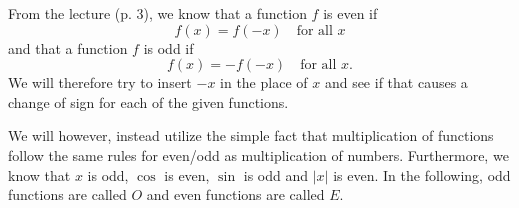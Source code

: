 \begin{derivation}
  From the lecture (p. 3), we know that a function $f$ is even if
  \begin{equation*}
    f(x) = f(-x) \quad \text{for all } x
  \end{equation*}
  and that a function $f$ is odd if
  \begin{equation*}
    f(x) = - f(-x) \quad \text{for all } x
  .\end{equation*}
  We will therefore try to insert $-x$ in the place of $x$ and see if that causes a change of sign for each of the given functions.

  We will however, instead utilize the simple fact that multiplication of functions follow the same rules for even/odd as multiplication of numbers.
  Furthermore, we know that $x$ is odd, $\cos$ is even, $\sin$ is odd and $\left| x \right|$ is even.
  In the following, odd functions are called $O$ and even functions are called $E$.


\end{derivation}
